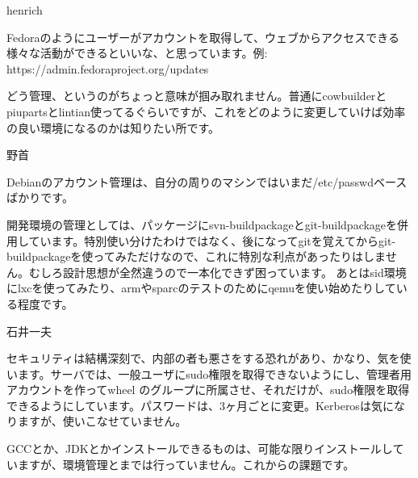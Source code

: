 \begin{prework}{ henrich }


Fedoraのようにユーザーがアカウントを取得して、ウェブからアクセスできる様々な活動ができるといいな、と思っています。例: https://admin.fedoraproject.org/updates


どう管理、というのがちょっと意味が掴み取れません。普通にcowbuilderとpiupartsとlintian使ってるぐらいですが、これをどのように変更していけば効率の良い環境になるのかは知りたい所です。
\end{prework}

\begin{prework}{ 野首 }

Debianのアカウント管理は、自分の周りのマシンではいまだ/etc/passwdベース
 ばかりです。

開発環境の管理としては、パッケージにsvn-buildpackageとgit-buildpackageを併用しています。特別使い分けたわけではなく、後になってgitを覚えてからgit-buildpackageを使ってみただけなので、これに特別な利点があったりはしません。むしろ設計思想が全然違うので一本化できず困っています。
あとはsid環境にlxcを使ってみたり、armやsparcのテストのためにqemuを使い始めたりしている程度です。

\end{prework}

\begin{prework}{ 石井一夫 }


セキュリティは結構深刻で、内部の者も悪さをする恐れがあり、かなり、気を使います。サーバでは、一般ユーザにsudo権限を取得できないようにし、管理者用アカウントを作ってwheel のグループに所属させ、それだけが、sudo権限を取得できるようにしています。パスワードは、3ヶ月ごとに変更。Kerberosは気になりますが、使いこなせていません。


GCCとか、JDKとかインストールできるものは、可能な限りインストールしていますが、環境管理とまでは行っていません。これからの課題です。
\end{prework}

